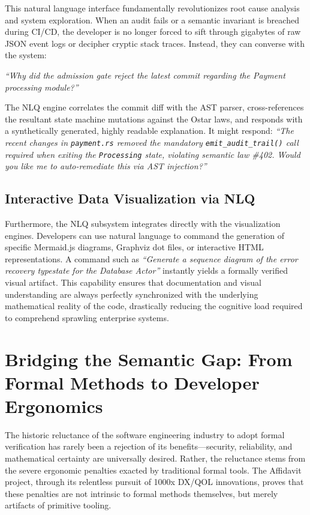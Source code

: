 This natural language interface fundamentally revolutionizes root cause analysis and system exploration. When an audit fails or a semantic invariant is breached during CI/CD, the developer is no longer forced to sift through gigabytes of raw JSON event logs or decipher cryptic stack traces. Instead, they can converse with the system:

\textit{``Why did the admission gate reject the latest commit regarding the Payment processing module?''}

The NLQ engine correlates the commit diff with the AST parser, cross-references the resultant state machine mutations against the Ostar laws, and responds with a synthetically generated, highly readable explanation. It might respond: \textit{``The recent changes in \texttt{payment.rs} removed the mandatory \texttt{emit\_audit\_trail()} call required when exiting the \texttt{Processing} state, violating semantic law \#402. Would you like me to auto-remediate this via AST injection?''}

\subsection{Interactive Data Visualization via NLQ}

Furthermore, the NLQ subsystem integrates directly with the visualization engines. Developers can use natural language to command the generation of specific Mermaid.js diagrams, Graphviz dot files, or interactive HTML representations. A command such as \textit{``Generate a sequence diagram of the error recovery typestate for the Database Actor''} instantly yields a formally verified visual artifact. This capability ensures that documentation and visual understanding are always perfectly synchronized with the underlying mathematical reality of the code, drastically reducing the cognitive load required to comprehend sprawling enterprise systems.

\section{Bridging the Semantic Gap: From Formal Methods to Developer Ergonomics}
\label{sec:qol_conclusion}

The historic reluctance of the software engineering industry to adopt formal verification has rarely been a rejection of its benefits---security, reliability, and mathematical certainty are universally desired. Rather, the reluctance stems from the severe ergonomic penalties exacted by traditional formal tools. The Affidavit project, through its relentless pursuit of 1000x DX/QOL innovations, proves that these penalties are not intrinsic to formal methods themselves, but merely artifacts of primitive tooling.

